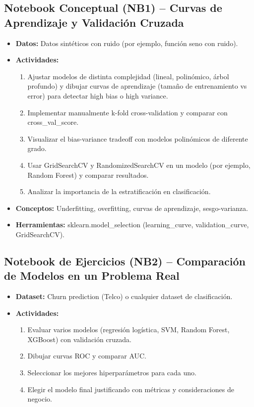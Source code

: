 \documentclass[12pt,a4paper]{article}
\begin{document}
\subsection*{Notebook Conceptual (NB1) – Curvas de Aprendizaje y Validación Cruzada}
\begin{itemize}
    \item \textbf{Datos:} Datos sintéticos con ruido (por ejemplo, función seno con ruido).
    \item \textbf{Actividades:}
    \begin{enumerate}
        \item Ajustar modelos de distinta complejidad (lineal, polinómico, árbol profundo) y dibujar curvas de aprendizaje (tamaño de entrenamiento vs error) para detectar high bias o high variance.
        \item Implementar manualmente k-fold cross-validation y comparar con cross\_val\_score.
        \item Visualizar el bias-variance tradeoff con modelos polinómicos de diferente grado.
        \item Usar GridSearchCV y RandomizedSearchCV en un modelo (por ejemplo, Random Forest) y comparar resultados.
        \item Analizar la importancia de la estratificación en clasificación.
    \end{enumerate}
    \item \textbf{Conceptos:} Underfitting, overfitting, curvas de aprendizaje, sesgo-varianza.
    \item \textbf{Herramientas:} sklearn.model\_selection (learning\_curve, validation\_curve, GridSearchCV).
\end{itemize}

\subsection*{Notebook de Ejercicios (NB2) – Comparación de Modelos en un Problema Real}
\begin{itemize}
    \item \textbf{Dataset:} Churn prediction (Telco) o cualquier dataset de clasificación.
    \item \textbf{Actividades:}
    \begin{enumerate}
        \item Evaluar varios modelos (regresión logística, SVM, Random Forest, XGBoost) con validación cruzada.
        \item Dibujar curvas ROC y comparar AUC.
        \item Seleccionar los mejores hiperparámetros para cada uno.
        \item Elegir el modelo final justificando con métricas y consideraciones de negocio.
    \end{enumerate}
\end{itemize}
\end{document}
